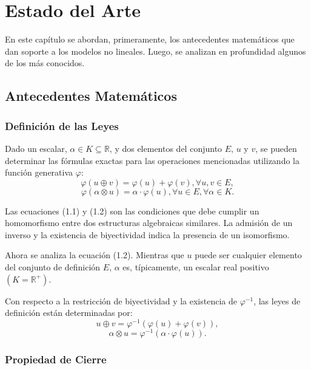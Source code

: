 \chapter{Estado del Arte}\label{chapter:state-of-the-art}

En este cap\'itulo se abordan, primeramente, los antecedentes matem\'aticos que dan soporte a los modelos no lineales. Luego, se analizan en profundidad algunos de los m\'as conocidos.

\section{Antecedentes Matemáticos}

\subsection{Definición de las Leyes}

Dado un escalar, $\alpha \in K \subseteq \mathbb{R}$, y dos elementos del conjunto $E$, $u$ y $v$, se pueden determinar las fórmulas exactas para las operaciones mencionadas utilizando la función generativa $\varphi$:
\begin{equation}
	\varphi(u\oplus v) = \varphi(u)+\varphi(v), \forall u,v \in E,
\end{equation}
\begin{equation}
	\varphi(\alpha \otimes u) = \alpha \cdot \varphi(u), \forall u \in E, \forall \alpha \in K.
\end{equation}

Las ecuaciones (1.1) y (1.2) son las condiciones que debe cumplir un homomorfismo entre dos estructuras algebraicas similares. La admisi\'on de un inverso y la existencia de biyectividad indica la presencia de un isomorfismo.

Ahora se analiza la ecuación (1.2). Mientras que $u$ puede ser cualquier elemento del conjunto de definici\'on $E$, $\alpha$ es, típicamente, un escalar real positivo $(K=\mathbb{R}^+)$.

Con respecto a la restricción de biyectividad y la existencia de $\varphi^{-1}$, las leyes de definición están determinadas por:
\begin{equation}
	u \oplus v = \varphi^{-1}(\varphi(u)+\varphi(v)),	
\end{equation}
\begin{equation}	
	\alpha \otimes u = \varphi^{-1}(\alpha\cdot\varphi(u)).
\end{equation} 

\subsection{Propiedad de Cierre}

